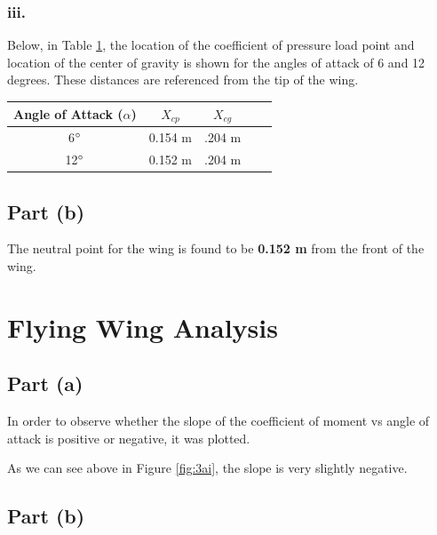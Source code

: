 \begin{singlespace}
\subsubsection{iii.}
Below, in Table \ref{table:2aiii}, the location of the coefficient of pressure load point and location of the center of gravity is shown for the angles of attack of 6 and 12 degrees. These distances are referenced from the tip of the wing.
\begin{table}[H]
    \centering
        \begin{tabular}{|c|c|c|c|c|} %
            \hline \textbf{Angle of Attack ($\alpha$)} & \textbf{$X_{cp}$} & \textbf{$X_{cg}$} \\ \hline %
            6$\degree$ & 0.154 m & .204 m \\ \hline
           12$\degree$ & 0.152 m & .204 m \\ \hline
        \end{tabular}
        \label{table:2aiii}
    \end{table}
\subsection{Part (b)}
The neutral point for the wing is found to be \textbf{0.152 m} from the front of the wing.

\section{Flying Wing Analysis}
\subsection{Part (a)}
In order to observe whether the slope of the coefficient of moment vs angle of attack is positive or negative, it was plotted.

As we can see above in Figure \ref{fig:3ai}, the slope is very slightly negative.
\subsection{Part (b)}
\end{singlespace}
